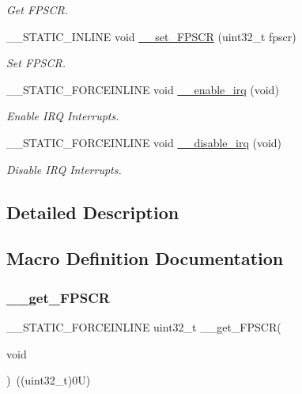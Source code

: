 \begin{DoxyCompactItemize}
\begin{DoxyCompactList}\small\item\em Get F\+P\+S\+CR. \end{DoxyCompactList}\item 
\+\_\+\+\_\+\+S\+T\+A\+T\+I\+C\+\_\+\+I\+N\+L\+I\+NE void \mbox{\hyperlink{group___c_m_s_i_s___core___reg_acc_functions_ga63aa6f7ed41dcaf39cbccb11e812ad4e}{\+\_\+\+\_\+set\+\_\+\+F\+P\+S\+CR}} (uint32\+\_\+t fpscr)
\begin{DoxyCompactList}\small\item\em Set F\+P\+S\+CR. \end{DoxyCompactList}\item 
\+\_\+\+\_\+\+S\+T\+A\+T\+I\+C\+\_\+\+F\+O\+R\+C\+E\+I\+N\+L\+I\+NE void \mbox{\hyperlink{group___c_m_s_i_s___core___reg_acc_functions_gae84bf4e95944e61937f4ed2453e5ef23}{\+\_\+\+\_\+enable\+\_\+irq}} (void)
\begin{DoxyCompactList}\small\item\em Enable I\+RQ Interrupts. \end{DoxyCompactList}\item 
\+\_\+\+\_\+\+S\+T\+A\+T\+I\+C\+\_\+\+F\+O\+R\+C\+E\+I\+N\+L\+I\+NE void \mbox{\hyperlink{group___c_m_s_i_s___core___reg_acc_functions_ga2299877e4ba3e162ca9dbabd6e0abef6}{\+\_\+\+\_\+disable\+\_\+irq}} (void)
\begin{DoxyCompactList}\small\item\em Disable I\+RQ Interrupts. \end{DoxyCompactList}\end{DoxyCompactItemize}


\subsection{Detailed Description}


\subsection{Macro Definition Documentation}
\mbox{\label{group___c_m_s_i_s___core___reg_acc_functions_ga4d0739b1355ca5642a7ce76df1271f01}} 
\subsubsection{\texorpdfstring{\_\_get\_FPSCR}{\_\_get\_FPSCR}\hspace{0.1cm}{\footnotesize\ttfamily [1/2]}}
{\footnotesize\ttfamily \+\_\+\+\_\+\+S\+T\+A\+T\+I\+C\+\_\+\+F\+O\+R\+C\+E\+I\+N\+L\+I\+NE uint32\+\_\+t \+\_\+\+\_\+get\+\_\+\+F\+P\+S\+CR(\begin{DoxyParamCaption}\item[{}]{void }\end{DoxyParamCaption})~((uint32\+\_\+t)0\+U)}



